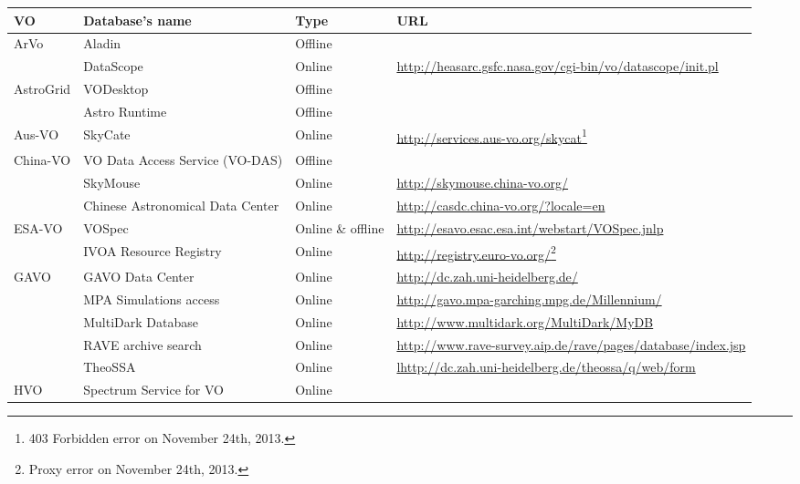 \begin{table}%
\centering
\begin{tabular}{|m{2cm}|m{4.5cm}|m{1.5cm}|m{6cm}|}
    \hline
    \textbf{VO} & \textbf{Database's name} & \textbf{Type} & \textbf{URL}
    \\
    \hline
    \multirow{2}{*}{ArVo} & Aladin & Offline & \\
    \cline{2-4}
     & DataScope & Online 
     & \url{http://heasarc.gsfc.nasa.gov/cgi-bin/vo/datascope/init.pl} \\
     \hline
    \multirow{2}{*}{AstroGrid} & VODesktop & Offline & \\
    \cline{2-4}
     & Astro Runtime & Offline & \\
     \hline
    Aus-VO & SkyCate & Online &
    \url{http://services.aus-vo.org/skycat}\footnote{403 Forbidden error on 
                                                     November 24th, 2013.} \\ 
    \hline
    \multirow{3}{*}{China-VO} & VO Data Access Service (VO-DAS) & Offline & \\
    \cline{2-4}
     & SkyMouse & Online & \url{http://skymouse.china-vo.org/} \\
     \hline
     & Chinese Astronomical Data Center & Online 
     & \url{http://casdc.china-vo.org/?locale=en} \\
     \hline
    \multirow{2}{*}{ESA-VO} & VOSpec & Online \& offline &
    \url{http://esavo.esac.esa.int/webstart/VOSpec.jnlp} \\
     \cline{2-4}
     & IVOA Resource Registry & Online &
     \url{http://registry.euro-vo.org/}\footnote{Proxy error on November 24th,
                                                 2013.} \\
     \hline
    \multirow{5}{*}{GAVO} & GAVO Data Center & Online &
    \url{http://dc.zah.uni-heidelberg.de/} \\
    \cline{2-4}
     & MPA Simulations access & Online &
     \url{http://gavo.mpa-garching.mpg.de/Millennium/} \\
     \cline{2-4}
     & MultiDark Database & Online &
     \url{http://www.multidark.org/MultiDark/MyDB} \\
     \cline{2-4}
     & RAVE archive search & Online &
     \url{http://www.rave-survey.aip.de/rave/pages/database/index.jsp} \\
     \cline{2-4}
     & TheoSSA & Online &
     \url{lhttp://dc.zah.uni-heidelberg.de/theossa/q/web/form} \\
     \hline
    \multirow{2}{*}{HVO} & Spectrum Service for VO & Online &

\end{tabular}
\end{table}
